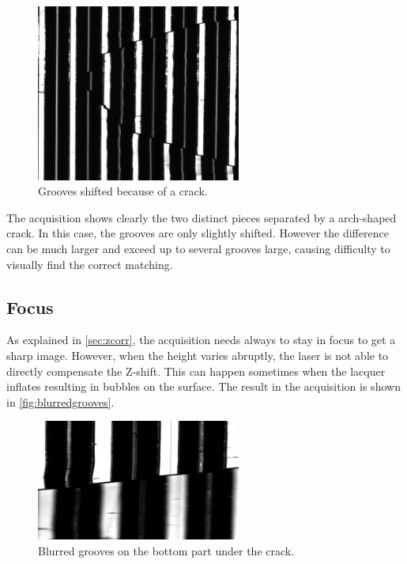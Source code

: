 \begin{figure}[!ht]
\centering
\includegraphics[width=0.6\textwidth]{images/shifted-grooves}
\caption{Grooves shifted because of a crack.}
\label{fig:shiftedgrooves}
\end{figure}

The acquisition shows clearly the two distinct pieces separated by a arch-shaped crack. In this case, the grooves are only slightly shifted. However the difference can be much larger and exceed up to several grooves large, causing difficulty to visually find the correct matching.

\subsection{Focus}

As explained in \autoref{sec:zcorr}, the acquisition needs always to stay in focus to get a sharp image. However, when the height varies abruptly, the laser is not able to directly compensate the Z-shift. This can happen sometimes when the lacquer inflates resulting in bubbles on the surface. The result in the acquisition is shown in \autoref{fig:blurredgrooves}.

\begin{figure}[!ht]
\centering
\includegraphics[width=0.6\textwidth]{images/blurred-grooves}
\caption{Blurred grooves on the bottom part under the crack.}
\label{fig:blurredgrooves}
\end{figure}


